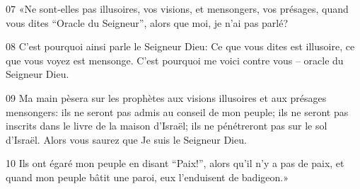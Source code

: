 
07 «Ne sont-elles pas illusoires, vos visions, et mensongers, vos présages, quand vous dites “Oracle du Seigneur”, alors que moi, je n’ai pas parlé?

08 C’est pourquoi ainsi parle le Seigneur Dieu: Ce que vous dites est illusoire, ce que vous voyez est mensonge. C’est pourquoi me voici contre vous – oracle du Seigneur Dieu.

09 Ma main pèsera sur les prophètes aux visions illusoires et aux présages mensongers: ils ne seront pas admis au conseil de mon peuple; ils ne seront pas inscrits dans le livre de la maison d’Israël; ils ne pénétreront pas sur le sol d’Israël. Alors vous saurez que Je suis le Seigneur Dieu.

10 Ils ont égaré mon peuple en disant “Paix!”, alors qu’il n’y a pas de paix, et quand mon peuple bâtit une paroi, eux l’enduisent de badigeon.»
